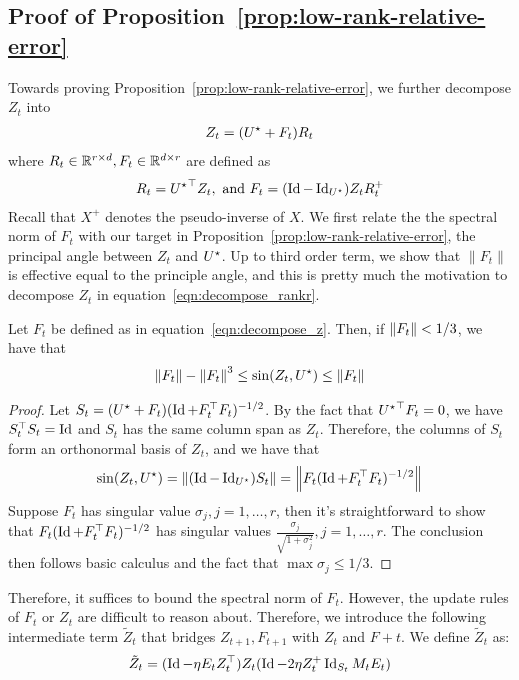 \subsection{Proof of Proposition~\ref{prop:low-rank-relative-error}}

Towards proving Proposition~\ref{prop:low-rank-relative-error}, we further decompose $Z_t$ into 
\begin{align}
Z_t = ({{U}^\star} + F_t)R_t \label{eqn:decompose_rankr}
\end{align}
where $R_t\in \mathbb{R}^{r\times d}, F_t\in \mathbb{R}^{d\times r}$ are defined as
\begin{align}
R_t = {{U}^\star}^\top Z_t, \textup{ and } F_t = (\operatorname{Id}- \operatorname{Id}_{{{U}^\star}})Z_t R_t^{+} \label{eqn:decompose_z}
\end{align}
Recall that $X^+$ denotes the pseudo-inverse of $X$. We first relate the the spectral norm of $F_t$ with our target in Proposition~\ref{prop:low-rank-relative-error}, the principal angle between $Z_t$ and ${{U}^\star}$.  Up to third order term, we show that $\|F_t\|$ is effective equal to the principle angle, and this is pretty much the motivation to decompose $Z_t$ in equation~\eqref{eqn:decompose_rankr}. 



\begin{lem}\label{lem:angleF}
	Let $F_t$ be defined as in equation~\eqref{eqn:decompose_z}. Then, if $\left\|F_t\right\| < 1/3$, we have that 
	\begin{align}
	\left\|F_t\right\| - \left\|F_t\right\|^3 \le \sin(Z_t, {{U}^\star}) \le \left\|F_t\right\| \nonumber
	\end{align}
\end{lem}
\begin{proof}
	Let $S_t = ({{U}^\star} + F_t)(\operatorname{Id} + F_t^\top F_t)^{-1/2}$. By the fact that ${{U}^\star}^\top F_t = 0$, we have $S_t^\top S_t = \operatorname{Id}$ and $S_t$ has the same column span as $Z_t$. Therefore, the columns of $S_t$ form an orthonormal basis of $Z_t$, and we have that 
	\begin{align}
	\sin(Z_t, {{U}^\star}) = \left\|(\operatorname{Id} - \operatorname{Id}_{{{U}^\star}})S_t\right\| = \left\|F_t(\operatorname{Id} + F_t^\top F_t)^{-1/2}\right\|\nonumber
	\end{align}
	\sloppy Suppose $F_t$ has singular value $\sigma_j, j=1,\dots, r$, then it's straightforward to show that $F_t(\operatorname{Id} + F_t^\top F_t)^{-1/2}$ has singular values $\frac{\sigma_j}{\sqrt{1+\sigma_j^2}}, j=1,\dots, r$. The conclusion then follows basic calculus and the fact that $\max \sigma_j \le 1/3$. 
\end{proof}

Therefore, it suffices to bound the spectral norm of $F_t$.  However, the update rules of $F_t$ or $Z_t$ are difficult to reason about. Therefore, we introduce the following intermediate term $\tilde{Z}_t$ that bridges $Z_{t+1}, F_{t+1}$ with $Z_t$ and $F+t$. We define $\tilde{Z}_t$ as:
\begin{align}
\tilde{Z}_t = (\operatorname{Id} -  \eta E_t Z_t^{\top})Z_t ( \operatorname{Id} -  2 \eta Z_t^{+} \operatorname{Id}_{S_t} M_t E_t )
\end{align}

